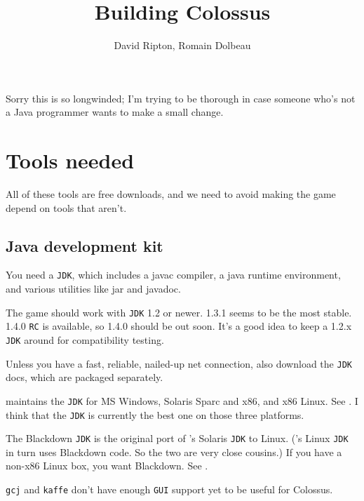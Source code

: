 \documentclass{article}
\begin{document}

\title{Building Colossus}

\author{David Ripton, Romain Dolbeau}

\maketitle

Sorry this is so longwinded; I'm trying to be thorough in case 
someone who's not a Java programmer wants to make a small change.

\section{Tools needed}

All of these tools are free downloads, and we need to avoid making 
the game depend on tools that aren't.

\subsection{Java development kit}

You need a \texttt{JDK}, which includes a javac compiler, a java runtime
environment,  and various utilities like jar and javadoc.

The game should work with \texttt{JDK} 1.2 or newer. 1.3.1 seems to be 
the most stable. 1.4.0 \texttt{RC} is available, so 1.4.0 should be out soon.
It's a good idea to keep a 1.2.x \texttt{JDK} around for compatibility testing.

Unless you have a fast, reliable, nailed-up net connection, also 
download the \texttt{JDK} docs, which are packaged separately.

 maintains the \texttt{JDK}
for MS Windows, Solaris Sparc and x86, and x86 Linux. See
. I think that the
 \texttt{JDK} is currently
the best one on those three platforms.

The Blackdown \texttt{JDK} is the original port of
's Solaris \texttt{JDK}
to Linux. ('s Linux
\texttt{JDK} in turn uses Blackdown code. So the two are very close cousins.)
If you have a non-x86 Linux box, you want Blackdown. See
.

\texttt{gcj} and \texttt{kaffe} don't have enough \texttt{GUI} support yet to
be useful for Colossus.
\end{document}
